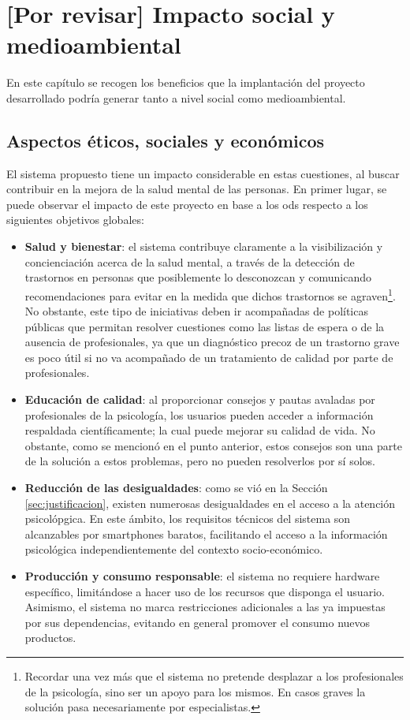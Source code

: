 \chapter{[Por revisar] Impacto social y medioambiental}
\label{chapter:aspectos}


En este capítulo se recogen los beneficios que la implantación del proyecto desarrollado podría generar tanto a nivel social como medioambiental.

\section{Aspectos éticos, sociales y económicos}
    El sistema propuesto tiene un impacto considerable en estas cuestiones, al buscar contribuir en la mejora de la salud mental de las personas. En primer lugar, se puede observar el impacto de este proyecto en base a los \gls{ods} respecto a los siguientes objetivos globales:

    \begin{itemize}
        \item \textbf{Salud y bienestar}: el sistema contribuye claramente a la visibilización y concienciación acerca de la salud mental, a través de la detección de trastornos en personas que posiblemente lo desconozcan y comunicando recomendaciones para evitar en la medida que dichos trastornos se agraven\footnote{Recordar una vez más que el sistema no pretende desplazar a los profesionales de la psicología, sino ser un apoyo para los mismos. En casos graves la solución pasa necesariamente por especialistas.}. No obstante, este tipo de iniciativas deben ir acompañadas de políticas públicas que permitan resolver cuestiones como las listas de espera o de la ausencia de profesionales, ya que un diagnóstico precoz de un trastorno grave es poco útil si no va acompañado de un tratamiento de calidad por parte de profesionales.
        \item \textbf{Educación de calidad}: al proporcionar consejos y pautas avaladas por profesionales de la psicología, los usuarios pueden acceder a información respaldada científicamente; la cual puede mejorar su calidad de vida. No obstante, como se mencionó en el punto anterior, estos consejos son una parte de la solución a estos problemas, pero no pueden resolverlos por sí solos.
        \item \textbf{Reducción de las desigualdades}: como se vió en la Sección \ref{sec:justificacion}, existen numerosas desigualdades en el acceso a la atención psicolópgica. En este ámbito, los requisitos técnicos del sistema son alcanzables por \glspl{smartphone} baratos, facilitando el acceso a la información psicológica independientemente del contexto socio-económico.
        \item \textbf{Producción y consumo responsable}: el sistema no requiere hardware específico, limitándose a hacer uso de los recursos que disponga el usuario. Asimismo, el sistema no marca restricciones adicionales a las ya impuestas por sus dependencias, evitando en general promover el consumo nuevos productos.
    \end{itemize}

